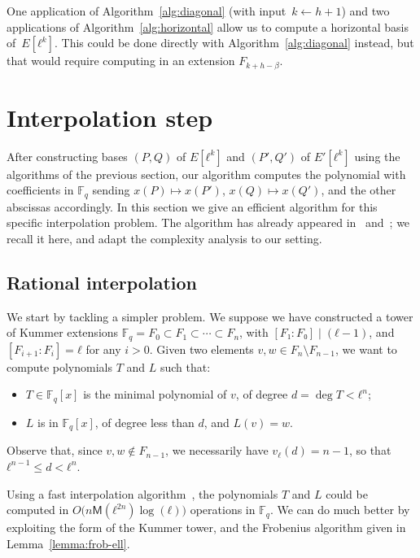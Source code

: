 \documentclass{lms}
\def\cout#1{\mathsf{#1}}
\newcommand{\F}{\mathbb{F}}
\newcommand{\MM}{\cout{M}}
\begin{document}
One application of Algorithm~\ref{alg:diagonal} (with input~$k ← h+1$)
and two applications of Algorithm~\ref{alg:horizontal} allow us
to compute a horizontal basis of~$E[ℓ^k]$.
This could be done directly with Algorithm~\ref{alg:diagonal} instead,
but that would require computing in an extension $F_{k+h-\beta}$.



\section{Interpolation step}
\label{sec:interpolation}

After constructing bases $(P,Q)$ of $E[ℓ^k]$ and $(P',Q')$ of
$E'[ℓ^k]$ using the algorithms of the previous section, our algorithm
computes the polynomial with coefficients in $\F_q$ sending
$x(P)↦x(P')$, $x(Q)↦x(Q')$, and the other abscissas accordingly.  In
this section we give an efficient algorithm for this specific
interpolation problem. The algorithm has already appeared
in~\cite{df10} and~\cite{enge+morain03}; we recall it here, and adapt
the complexity analysis to our setting.

\subsection{Rational interpolation}

We start by tackling a simpler problem. We suppose we have constructed
a tower of Kummer extensions $\F_q=F_0⊂F_1⊂\cdots⊂F_n$, with
$[F₁:F₀]\mid(ℓ-1)$, and $[F_{i+1}:F_i]=ℓ$ for any $i>0$. Given two
elements $v,w∈F_n\setminus F_{n-1}$, we want to compute polynomials
$T$ and $L$ such that:
\begin{itemize}
\item $T \in \F_q[x]$ is the minimal polynomial of $v$, of degree
  $d=\deg T<ℓ^n$;
\item $L$ is in $\F_q[x]$, of degree less than $d$, and $L(v)=w$.
\end{itemize}
Observe that, since $v,w∉F_{n-1}$, we necessarily have $v_ℓ(d)=n-1$,
so that $ℓ^{n-1}≤d<ℓ^n$.

Using a fast interpolation algorithm~\cite[Chapter~10.2]{vzGG}, the
polynomials $T$ and $L$ could be computed in
$O\bigl(n\MM(ℓ^{2n})\log(ℓ)\bigr)$ operations in $\F_q$. We can do
much better by exploiting the form of the Kummer tower, and the
Frobenius algorithm given in Lemma~\ref{lemma:frob-ell}.
\end{document}
